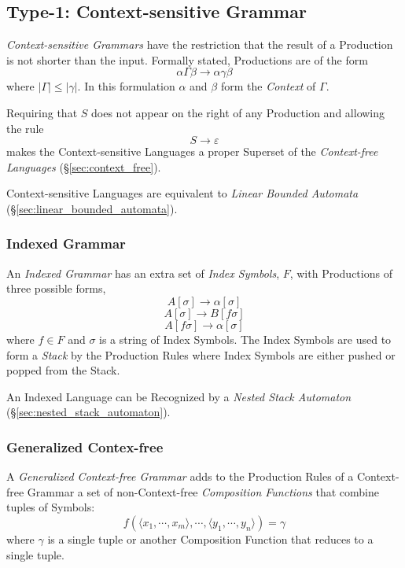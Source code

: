 \subsection{Type-1: Context-sensitive Grammar}\label{sec:context_sensitive}

\emph{Context-sensitive Grammars} have the restriction that the result
of a Production is not shorter than the input. Formally stated,
Productions are of the form
\[
    \alpha \Gamma \beta \rightarrow \alpha \gamma \beta
\]
where $|\Gamma| \leq |\gamma|$. In this formulation $\alpha$ and
$\beta$ form the \emph{Context} of $\Gamma$.

Requiring that $S$ does not appear on the right of any Production
and allowing the rule
\[
    S \rightarrow \varepsilon
\]
makes the Context-sensitive Languages a proper Superset of the
\emph{Context-free Languages} (\S\ref{sec:context_free}).

Context-sensitive Languages are equivalent to \emph{Linear
Bounded Automata} (\S\ref{sec:linear_bounded_automata}).



\subsubsection{Indexed Grammar}\label{subsubsection:indexed_grammar}

An \emph{Indexed Grammar} has an extra set of \emph{Index Symbols},
$F$, with Productions of three possible forms,
\[
    A[\sigma] \rightarrow \alpha[\sigma]
\]\[
    A[\sigma] \rightarrow B[f\sigma]
\]\[
    A[f\sigma] \rightarrow \alpha[\sigma]
\]
where $f \in F$ and $\sigma$ is a string of Index Symbols. The Index
Symbols are used to form a \emph{Stack} by the Production Rules where
Index Symbols are either pushed or popped from the Stack.

An Indexed Language can be Recognized by a \emph{Nested Stack
  Automaton} (\S\ref{sec:nested_stack_automaton}).\cite{aho69}



\subsubsection{Generalized Contex-free}\label{sec:generalized_context_free}

A \emph{Generalized Context-free Grammar} adds to the Production Rules
of a Context-free Grammar a set of non-Context-free \emph{Composition
  Functions} that combine tuples of Symbols:
\[
    f(\langle x_1,\cdots,x_m\rangle,\cdots,\langle
    y_1,\cdots,y_n\rangle)=\gamma
\]
where $\gamma$ is a single tuple or another Composition Function that
reduces to a single tuple.

